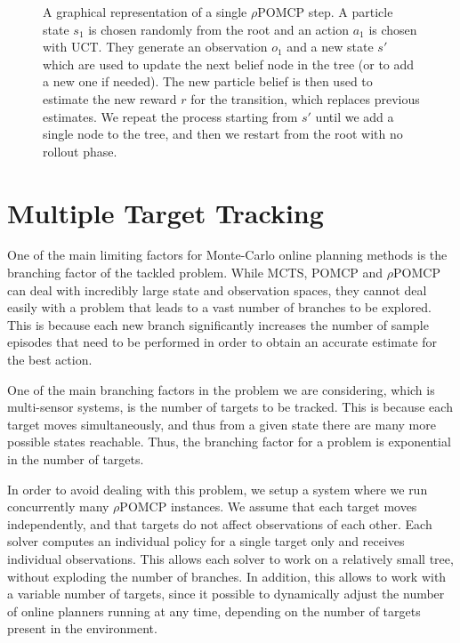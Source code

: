 \begin{figure}[ht!]
\caption{A graphical representation of a single $\rho$POMCP step. A particle state $s_1$ is chosen randomly from the root and an action $a_1$ is chosen with UCT. They generate an observation $o_1$ and a new state $s'$ which are used to update the next belief node in the tree (or to add a new one if needed). The new particle belief is then used to estimate the new reward $r$ for the transition, which replaces previous estimates. We repeat the process starting from $s'$ until we add a single node to the tree, and then we restart from the root with no rollout phase.}
\label{ref:rpomcpimg}
\end{figure}

\section{Multiple Target Tracking}

One of the main limiting factors for Monte-Carlo online planning methods is the branching factor of
the tackled problem. While MCTS, POMCP and $\rho$POMCP can deal with incredibly large state and
observation spaces, they cannot deal easily with a problem that leads to a vast number of branches
to be explored. This is because each new branch significantly increases the number of sample
episodes that need to be performed in order to obtain an accurate estimate for the best action.

One of the main branching factors in the problem we are considering, which is multi-sensor systems,
is the number of targets to be tracked. This is because each target moves simultaneously, and thus
from a given state there are many more possible states reachable. Thus, the branching factor for a
problem is exponential in the number of targets.

In order to avoid dealing with this problem, we setup a system where we run concurrently many
$\rho$POMCP instances. We assume that each target moves independently, and that targets do not
affect observations of each other. Each solver computes an individual policy for a single target
only and receives individual observations. This allows each solver to work on a relatively small
tree, without exploding the number of branches. In addition, this allows to work with a variable
number of targets, since it possible to dynamically adjust the number of online planners running at
any time, depending on the number of targets present in the environment.

